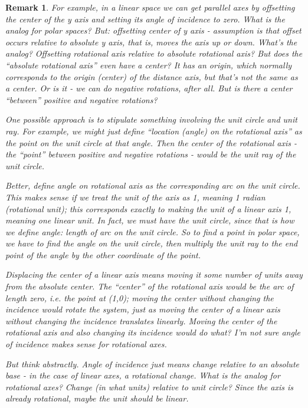 \documentclass[12pt]{tufte-handout}
\numberwithin{equation}{subsection}
\numberwithin{equation}{subsection}
\newtheorem{remark}{Remark}
\begin{document}
\begin{description}
\begin{remark}
      For example, in a linear space we can get parallel axes by
      offsetting the center of the y axis and setting its angle of
      incidence to zero.  What is the analog for polar spaces?  But:
      offsetting center of y axis - assumption is that offset occurs
      relative to absolute y axis, that is, moves the axis up or
      down.  What's the analog?  Offsetting rotational axis relative
      to absolute rotational axis?  But does the ``absolute
      rotational axis'' even have a center?  It has an origin, which
      normally corresponds to the origin (center) of the distance
      axis, but that's not the same as a center.  Or is it - we can
      do negative rotations, after all.  But is there a center
      ``between'' positive and negative rotations?

      One possible approach is to stipulate something involving the
      unit circle and unit ray.  For example, we might just define
      ``location (angle) on the rotational axis'' as the point on
      the unit circle at that angle.  Then the center of the
      rotational axis - the ``point'' between positive and negative
      rotations - would be the unit ray of the unit circle.

      Better, define angle on rotational axis as the corresponding
      arc on the unit circle.  This makes sense if we treat the unit
      of the axis as 1, meaning 1 radian (rotational unit); this
      corresponds exactly to making the unit of a linear axis 1,
      meaning one linear unit.  In fact, we must have the unit
      circle, since that is how we define angle: length of arc on
      the unit circle.  So to find a point in polar space, we have
      to find the angle on the unit circle, then multiply the unit
      ray to the end point of the angle by the other coordinate of
      the point.

      Displacing the center of a linear axis means moving it some
      number of units away from the absolute center.  The ``center''
      of the rotational axis would be the arc of length zero,
      i.e. the point at (1,0); moving the center without changing
      the incidence would rotate the system, just as moving the
      center of a linear axis without changing the incidence
      translates linearly.  Moving the center of the rotational axis
      and also changing its incidence would do what?  I'm not sure
      angle of incidence makes sense for rotational axes.

      But think abstractly.  Angle of incidence just means change
      relative to an absolute base - in the case of linear axes, a
      rotational change.  What is the analog for rotational axes?
      Change (in what units) relative to unit circle?  Since the
      axis is already rotational, maybe the unit should be linear.


\end{remark}
\end{description}
\end{document}
